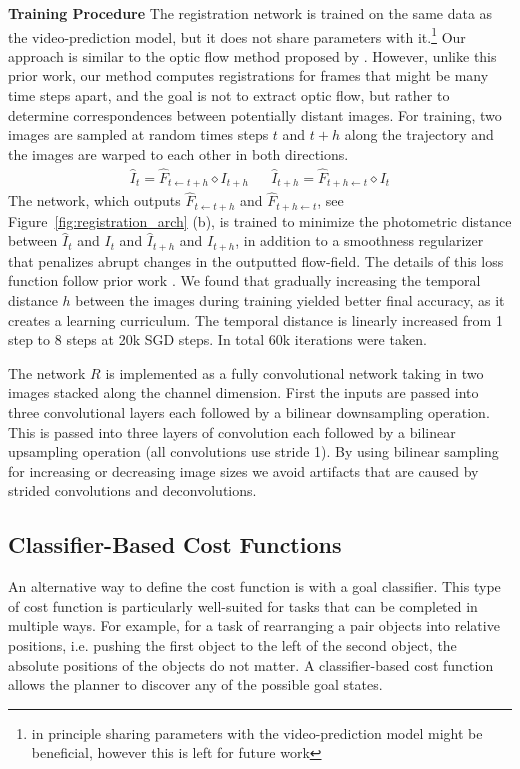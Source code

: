 \noindent \textbf{Training Procedure}
The registration network is trained on the same data as the video-prediction model, but it does not share parameters with it.\footnote{in principle sharing parameters with the video-prediction model might be beneficial, however this is left for future work} Our approach is similar to the optic flow method proposed by \cite{meister2017unflow}. However, unlike this prior work, our method computes registrations for frames that might be many time steps apart, and the goal is not to extract optic flow, but rather to determine correspondences between potentially distant images. For training, two images are sampled at random times steps $t$ and $t+h$ along the trajectory and the images are warped to each other in both directions. 
\begin{align}
\hat{I}_{t} = \hat{F}_{t \leftarrow t +h} \diamond  I_{t+h} &&
\hat{I}_{t+h} = \hat{F}_{t+h \leftarrow t} \diamond  I_{t}
\end{align}
The network, which outputs $\hat{F}_{t \leftarrow t +h}$ and $\hat{F}_{t+h \leftarrow t}$, see Figure~\ref{fig:registration_arch} (b), is trained to minimize the photometric distance between $\hat{I}_t$ and $I_t$ and $\hat{I}_{t+h}$ and $I_{t+h}$, in addition to a smoothness regularizer that penalizes abrupt changes in the outputted flow-field. The details of this loss function follow prior work \cite{meister2017unflow}. We found that gradually increasing the temporal distance $h$ between the images during training yielded better final accuracy, as it creates a learning curriculum. The temporal distance is linearly increased from 1 step to 8 steps at 20k SGD steps. In total 60k iterations were taken.

The network $R$ is implemented as a fully convolutional network taking in two images stacked along the channel dimension. First the inputs are passed into three convolutional layers each followed by a bilinear downsampling operation. This is passed into three layers of convolution each followed by a bilinear upsampling operation (all convolutions use stride 1). By using bilinear sampling for increasing or decreasing image sizes we avoid artifacts that are caused by strided convolutions and deconvolutions.


\subsection{Classifier-Based Cost Functions}
\label{subsec:class_cost}
An alternative way to define the cost function is with a goal classifier. This type of cost function is particularly well-suited for tasks that can be completed in multiple ways. For example, for a task of rearranging a pair objects into relative positions, i.e. pushing the first object to the left of the second object, the absolute positions of the objects do not matter. A classifier-based cost function allows the planner to discover any of the possible goal states.

